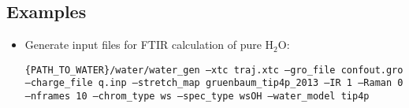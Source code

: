 \documentclass{article}
\begin{document}
\begin{itemize}
\subsection{Examples}
\begin{itemize}

\item Generate input files for FTIR calculation of pure H$_2$O:

\texttt{\{PATH\_TO\_WATER\}/water/water\_gen --xtc traj.xtc  --gro\_file confout.gro --charge\_file q.inp --stretch\_map gruenbaum\_tip4p\_2013  --IR 1 --Raman 0 --nframes 10 --chrom\_type ws  --spec\_type wsOH  --water\_model tip4p}

\end{itemize}

 

\end{itemize}
\end{document}
